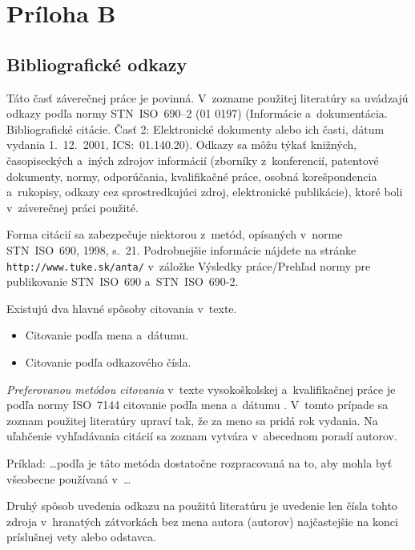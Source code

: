 \section*{Pr\'iloha B}
\subsection*{Bibliografick\'e odkazy}

Táto časť\/ záverečnej práce je povinná. V~zozname použitej literatúry
sa uvádzajú odkazy podľa normy STN~ISO~690--2 (01 0197) (Informácie
a~dokumentácia. Bibliografické citácie. Časť\/ 2: Elektronické
dokumenty alebo ich časti, dátum vydania 1.~12.~2001, ICS:~01.140.20).
Odkazy sa môžu týkať\/ knižných, časopiseckých a~iných zdrojov
informácií (zborníky z~konferencií, patentové dokumenty, normy,
odporúčania, kvalifikačné práce, osobná korešpondencia a~rukopisy,
odkazy cez sprostredkujúci zdroj, elektronické publikácie), ktoré boli
v~záverečnej práci použité.

Forma citácií sa zabezpečuje niektorou z~metód, opísaných v~norme
STN~ISO~690, 1998, s.~21. Podrobnejšie informácie nájdete na stránke
\texttt{http://www.tuke.sk/anta/} v~záložke {\small\sf Výsledky
práce/Prehľad normy pre publikovanie STN~ISO~690 a~STN~ISO~690-2}.

Existujú dva hlavné spôsoby citovania v~texte.

\begin{itemize}
\item Citovanie podľa mena a~dátumu.
\item Citovanie podľa odkazového čísla.
\end{itemize}

\emph{Preferovanou metódou citovania} v~texte vysokoškolskej
a~kvalifikačnej práce je podľa normy ISO~7144 citovanie podľa mena
a~dátumu \citep{kat,gonda}. V~tomto prípade sa zoznam použitej
literatúry upraví tak, že za meno sa pridá rok vydania. Na uľahčenie
vyhľadávania citácií sa zoznam vytvára v~abecednom poradí autorov.

\medskip

Príklad:
\dots podľa \citep{steinerova} je táto metóda dostatočne rozpracovaná
na to, aby mohla byť\/ všeobecne používaná v~\dots

\medskip

Druhý spôsob uvedenia odkazu na použitú literatúru je uvedenie len
čísla tohto zdroja v~hranatých zátvorkách bez mena autora (autorov)
najčastejšie na konci príslušnej vety alebo odstavca.

